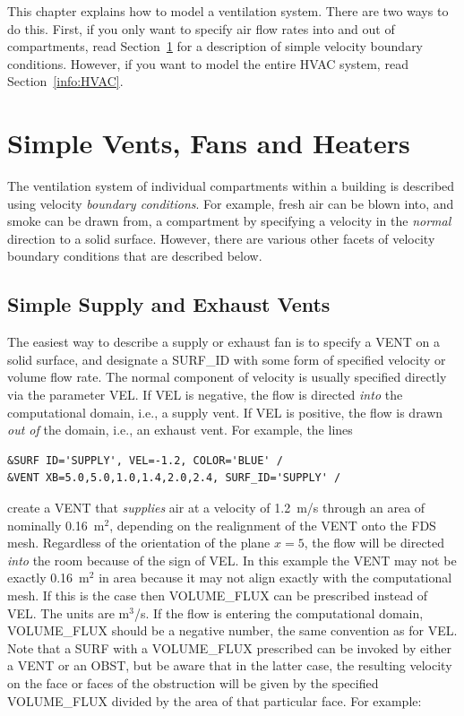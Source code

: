 \documentclass[11pt]{book}
\begin{document}
This chapter explains how to model a ventilation system. There are two ways to do this. First, if you only want to specify air flow rates into and out of
compartments, read Section~\ref{info:Velocity_BC} for a description of simple velocity boundary conditions. However, if you want to
model the entire HVAC system, read Section~\ref{info:HVAC}.


\section{Simple Vents, Fans and Heaters}
\label{info:Velocity_BC}

The ventilation system of individual compartments within a building is described using
velocity {\em boundary conditions}. For example, fresh air can be blown into, and smoke can
be drawn from, a compartment by specifying a velocity in the {\em normal} direction to a solid
surface. However, there are various other facets of velocity boundary conditions that are described below.

\subsection{Simple Supply and Exhaust Vents}

The easiest way to describe a supply or exhaust fan is to specify a {\ct VENT} on a solid surface, and designate
a {\ct SURF\_ID} with some form of specified velocity or volume flow rate.
The normal component of velocity is usually specified directly via the parameter
{\ct VEL}. If {\ct VEL} is negative, the flow is directed {\em into} the
computational domain, i.e., a supply vent. If {\ct VEL} is positive, the flow is drawn {\em out of} the
domain, i.e., an exhaust vent. For example, the lines

\begin{lstlisting}
&SURF ID='SUPPLY', VEL=-1.2, COLOR='BLUE' /
&VENT XB=5.0,5.0,1.0,1.4,2.0,2.4, SURF_ID='SUPPLY' /
\end{lstlisting}

\noindent
create a {\ct VENT} that {\em supplies} air at a velocity of 1.2~m/s through an area of nominally 0.16~m$^2$, depending on the
realignment of the {\ct VENT} onto the FDS mesh. Regardless of the
orientation of the plane $x=5$, the flow will be directed {\em into} the room because of the sign of {\ct VEL}.
In this example the {\ct VENT} may not be exactly
0.16~m$^2$ in area because it may not align exactly with the computational mesh. If this is the case then
{\ct VOLUME\_FLUX} can be prescribed instead of {\ct VEL}. The units
are m$^3$/s. If the flow is entering the computational domain, {\ct VOLUME\_FLUX}
should be a negative number, the same convention as for {\ct VEL}. Note that a {\ct SURF}
with a {\ct VOLUME\_FLUX} prescribed can be invoked by either a
{\ct VENT} or an {\ct OBST}, but be aware that in the latter case, the resulting
velocity on the face or faces of the obstruction will be given by the specified
{\ct VOLUME\_FLUX} divided by the area of that particular face. For example:
\end{document}
